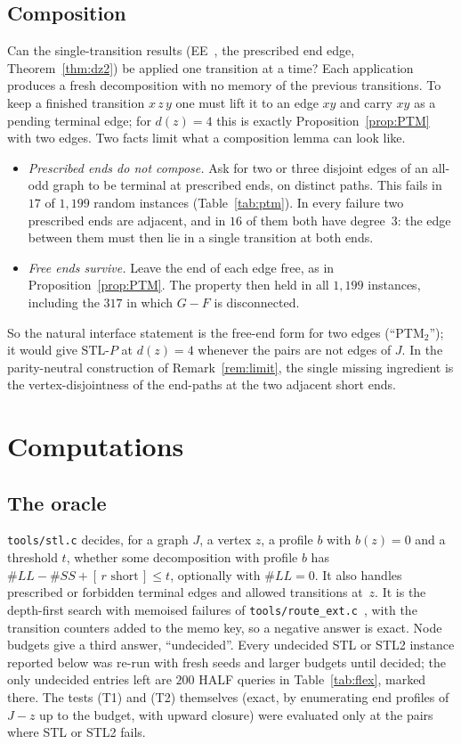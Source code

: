 \documentclass[11pt]{amsart}
\theoremstyle{definition}
\newcommand{\ind}[1]{[\,#1\,]}
\newcommand{\STL}{\mathrm{STL}}
\begin{document}
\subsection*{Composition}
Can the single-transition results (EE~\cite{MS}, the prescribed end edge, Theorem~\ref{thm:dz2}) be
applied one transition at a time? Each application produces a fresh decomposition with no memory of
the previous transitions. To keep a finished transition $x\,z\,y$ one must lift it to an edge $xy$
and carry $xy$ as a pending terminal edge; for $d(z)=4$ this is exactly
Proposition~\ref{prop:PTM} with two edges. Two facts limit what a composition lemma can look like.
\begin{itemize}
\item \emph{Prescribed ends do not compose.} Ask for two or three disjoint edges of an all-odd
graph to be terminal at prescribed ends, on distinct paths. This fails in $17$ of $1{,}199$ random
instances (Table~\ref{tab:ptm}). In every failure two prescribed ends are adjacent, and in $16$
of them both have degree~$3$: the edge between them must then lie in a single transition at both
ends.
\item \emph{Free ends survive.} Leave the end of each edge free, as in
Proposition~\ref{prop:PTM}. The property then held in all $1{,}199$ instances, including the $317$
in which $G-F$ is disconnected.
\end{itemize}
So the natural interface statement is the free-end form for two edges (``PTM$_2$''); it would give
$\STL\text{-}P$ at $d(z)=4$ whenever the pairs are not edges of $J$. In the parity-neutral
construction of Remark~\ref{rem:limit}, the single missing ingredient is the vertex-disjointness of
the end-paths at the two adjacent short ends.

\section{Computations}\label{sec:comp}

\subsection{The oracle}
\texttt{tools/stl.c} decides, for a graph $J$, a vertex $z$, a profile $b$ with $b(z)=0$ and a
threshold $t$, whether some decomposition with profile $b$ has $\#LL-\#SS+\ind{r\text{ short}}\le t$,
optionally with $\#LL=0$. It also handles prescribed or forbidden terminal edges and allowed
transitions at~$z$. It is the depth-first search with memoised failures of
\texttt{tools/route\_ext.c}~\cite{RD}, with the transition counters added to the memo key, so a
negative answer is exact. Node budgets give a third answer, ``undecided''. Every undecided STL or STL2 instance reported
below was re-run with fresh seeds and larger budgets until decided; the only undecided entries left
are $200$ HALF queries in Table~\ref{tab:flex}, marked there. The tests (T1) and (T2) themselves
(exact, by enumerating end profiles of $J-z$ up to the budget, with upward closure) were evaluated
only at the pairs where STL or STL2 fails.
\end{document}
